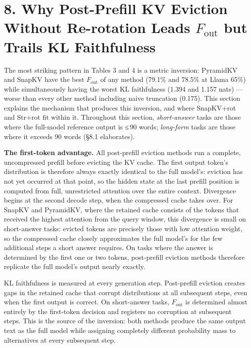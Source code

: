 \documentclass[10pt,letterpaper]{article}
\begin{document}
\hypertarget{why-post-prefill-kv-eviction-without-re-rotation-leads-f_textout-but-trails-kl-faithfulness}{%
\section{\texorpdfstring{8. Why Post-Prefill KV Eviction Without
Re-rotation Leads \(F_{\text{out}}\) but Trails KL
Faithfulness}{8. Why Post-Prefill KV Eviction Without Re-rotation Leads F\_\{\textbackslash text\{out\}\} but Trails KL Faithfulness}}\label{why-post-prefill-kv-eviction-without-re-rotation-leads-f_textout-but-trails-kl-faithfulness}}

The most striking pattern in Tables 3 and 4 is a metric inversion:
PyramidKV and SnapKV have the best \(F_{\text{out}}\) of any method
(79.1\% and 78.5\% at Llama 65\%) while simultaneously having the worst
KL faithfulness (1.394 and 1.157 nats) --- worse than every other method
including naive truncation (0.175). This section explains the mechanism
that produces this inversion, and where SnapKV+rot and Str+rot fit
within it. Throughout this section, \emph{short-answer} tasks are those
where the full-model reference output is ≤\,90 words; \emph{long-form}
tasks are those where it exceeds 90 words (§8.1 elaborates).

\textbf{The first-token advantage.} All post-prefill eviction methods
run a complete, uncompressed prefill before evicting the KV cache. The
first output token's distribution is therefore always exactly identical
to the full model's: eviction has not yet occurred at that point, so the
hidden state at the last prefill position is computed from full,
unrestricted attention over the entire context. Divergence begins at the
second decode step, when the compressed cache takes over. For SnapKV and
PyramidKV, where the retained cache consists of the tokens that received
the highest attention from the query window, this divergence is small on
short-answer tasks: evicted tokens are precisely those with low
attention weight, so the compressed cache closely approximates the full
model's for the few additional steps a short answer requires. On tasks
where the answer is determined by the first one or two tokens,
post-prefill eviction methods therefore replicate the full model's
output nearly exactly.

KL faithfulness is measured at every generation step. Post-prefill
eviction creates gaps in the retained cache that corrupt distributions
at all subsequent steps, even when the first output is correct. On
short-answer tasks, \(F_{\text{out}}\) is determined almost entirely by
the first-token decision and registers no corruption at subsequent
steps. This is the source of the inversion: both methods produce the
same output text as the full model while assigning completely different
probability mass to alternatives at every subsequent step.
\end{document}
